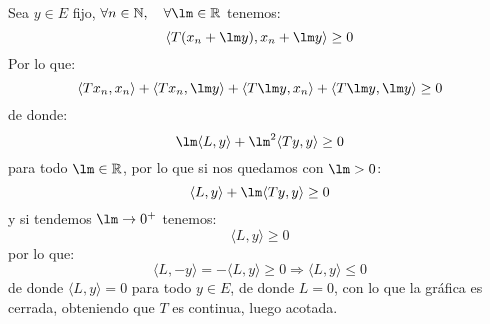 \begin{ejercicio}
\begin{description}
            \noindent
            Sea $y\in E$ fijo, $\forall n\in \mathbb{N}, \quad \forall \lm \in \mathbb{R}$ tenemos:
            \begin{equation*}
                \langle T(x_n+\lm y),x_n + \lm y \rangle  \geq 0
            \end{equation*}
            Por lo que:
            \begin{equation*}
                \langle Tx_n,x_n \rangle  + \langle Tx_n, \lm y \rangle  + \langle T\lm y, x_n \rangle  + \langle T\lm y, \lm y \rangle  \geq 0
            \end{equation*}
            de donde:
            \begin{equation*}
                \lm \langle L,y \rangle  + \lm^2 \langle Ty,y \rangle  \geq 0
            \end{equation*}
            para todo $\lm\in \mathbb{R}$, por lo que si nos quedamos con $\lm>0$:
            \begin{equation*}
                \langle L,y \rangle  + \lm\langle Ty,y \rangle  \geq 0
            \end{equation*}
            y si tendemos $\lm\to0^+$ tenemos:
            \begin{equation*}
                \langle L,y \rangle  \geq 0
            \end{equation*}
            por lo que:
            \begin{equation*}
                \langle L,-y \rangle  = -\langle L,y \rangle \geq 0 \Longrightarrow \langle L,y \rangle \leq 0
            \end{equation*}
            de donde $\langle L,y \rangle = 0 $ para todo $y\in E$, de donde $L=0$, con lo que la gráfica es cerrada, obteniendo que $T$ es continua, luego acotada.
    \end{description}
\end{ejercicio}

